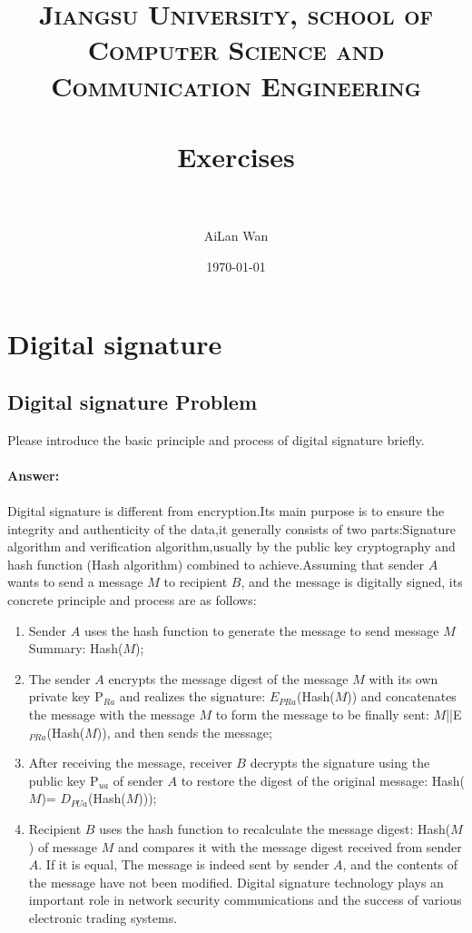 \documentclass[paper=a4, fontsize=11pt]{scrartcl} %
\title{
\normalfont \normalsize
\textsc{Jiangsu University, school of Computer Science and Communication Engineering} \\ [25pt] %
\horrule{0.5pt} \\[0.4cm] %
\huge Exercises \\ %
\horrule{2pt} \\[0.5cm] %
}
\author{AiLan Wan} %
\date{\normalsize\today} %
\numberwithin{equation}{section} %
\numberwithin{figure}{section} %
\numberwithin{table}{section} %
\begin{document}
\maketitle %
\section{Digital signature}
\label{sec:ds}
\subsection{Digital signature Problem \uppercase\expandafter{}}

Please introduce the basic principle and process of digital signature briefly.
\\
\\
\textbf{Answer:}
\\
\\
Digital signature is different from encryption.Its main purpose is to ensure the integrity and authenticity of the data,it generally consists of two parts:Signature algorithm and verification algorithm,usually by the public key cryptography and hash function (Hash algorithm) combined to achieve.Assuming that sender $A$ wants to send a message $M$ to recipient $B$, and the message is digitally signed, its concrete principle and process are as follows:
\begin{enumerate}
\item Sender $A$ uses the hash function to generate the message to send message $M$ Summary: Hash($M$);
\item The sender $A$ encrypts the message digest of the message $M$ with its own private key P$_{Ra}$ and realizes the signature: $E$$_{PRa}$(Hash($M$)) and concatenates the message with the message $M$ to form the message to be finally sent: $M$||E$_{PRa}$(Hash($M$)), and then sends the message;
\item After receiving the message, receiver $B$ decrypts the signature using the public key P$_{ua}$ of sender $A$ to restore the digest of the original message: Hash($M$)= $D$$_{PUa}$(Hash($M$)));
\item Recipient $B$ uses the hash function to recalculate the message digest: Hash($M$) of message $M$ and compares it with the message digest received from sender $A$. If it is equal, The message is indeed sent by sender $A$, and the contents of the message have not been modified. Digital signature technology plays an important role in network security communications and the success of various electronic trading systems.
\end{enumerate}
\end{document}

